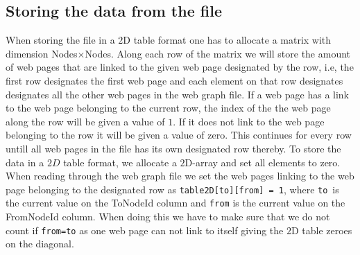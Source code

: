 \documentclass[onecolumn]{aastex62}
\begin{document}
\subsection{Storing the data from the file}
When storing the file in a $2$D table format one has to allocate a matrix with dimension Nodes$\times$Nodes. Along each row of the matrix we will store the amount of web pages that are linked to the given web page designated by the row, i.e, the first row designates the first web page and each element on that row designates designates all the other web pages in the web graph file. If a web page has a link to the web page belonging to the current row, the index of the the web page along the row will be given a value of $1$. If it does not link to the web page belonging to the row it will be given a value of zero. This continues for every row untill all web pages in the file has its own designated row thereby. To store the data in a $2D$ table format, we allocate a $2$D-array and set all elements to zero. When reading through the web graph file we set the web pages linking to the web page belonging to the designated row as \texttt{table2D[to][from] = 1}, where \texttt{to} is the current value on the ToNodeId column and \texttt{from} is the current value on the FromNodeId column. When doing this we have to make sure that we do not count if \texttt{from=to} as one web page can not link to itself giving the $2$D table zeroes on the diagonal.\\
\end{document}

